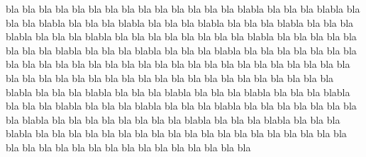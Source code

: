 \documentclass[11pt]{report}
\begin{document}
bla bla bla bla bla bla bla bla bla bla bla bla bla bla blabla bla bla bla blabla bla bla bla blabla bla bla bla blabla bla bla bla blabla bla bla bla blabla bla bla bla blabla bla bla bla blabla bla bla bla bla bla bla bla bla blabla bla bla bla bla bla bla bla bla blabla bla bla bla blabla bla bla bla blabla bla bla bla bla bla bla bla bla bla bla bla bla bla bla bla bla bla bla bla bla bla bla bla bla bla bla bla bla bla bla bla bla bla bla
bla bla bla bla bla bla bla bla bla bla bla bla bla bla blabla bla bla bla blabla bla bla bla blabla bla bla bla blabla bla bla bla blabla bla bla bla blabla bla bla bla blabla bla bla bla blabla bla bla bla bla bla bla bla bla blabla bla bla bla bla bla bla bla bla blabla bla bla bla blabla bla bla bla blabla bla bla bla bla bla bla bla bla bla bla bla bla bla bla bla bla bla bla bla bla bla bla bla bla bla bla bla bla bla bla bla bla bla bla
\end{document}
